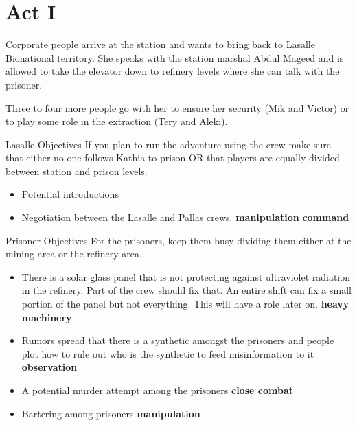 \chapter{Act I}



\begin{rpg-commentbox}{}

    Corporate people arrive at the station and  wants to bring  back to Lasalle Bionational territory. She speaks with the station marshal Abdul Mageed and is allowed to take the elevator down to refinery levels where she can talk with the prisoner.

    Three to four more people go with her to ensure her security (Mik and Victor) or to play some role in the extraction (Tery and Aleki). 
    
\end{rpg-commentbox}


\medskip
\begin{rpg-commentbox}{Lasalle Objectives}
If you plan to run the adventure using the crew make sure that either no one follows Kathia to prison OR that players are equally divided between station and prison levels.

\begin{itemize}
    \item Potential introductions

    \item Negotiation between the Lasalle and Pallas crews. \textbf{manipulation} \textbf{command}
\end{itemize}
\end{rpg-commentbox}



\medskip
\begin{rpg-commentbox}{Prisoner Objectives}
For the prisoners, keep them busy dividing them either at the mining area or the refinery area.

\begin{itemize}
    \item There is a solar glass panel that is not protecting against ultraviolet radiation in the refinery. Part of the crew should fix that. An entire shift can fix a small portion of the panel but not everything. This will have a role later on. \textbf{heavy machinery}

    \item Rumors spread that there is a synthetic amongst the prisoners and people plot how to rule out who is the synthetic to feed misinformation to it \textbf{observation}

    \item A potential murder attempt among the prisoners \textbf{close combat}

    \item Bartering among prisoners \textbf{manipulation}
\end{itemize}
\end{rpg-commentbox}


